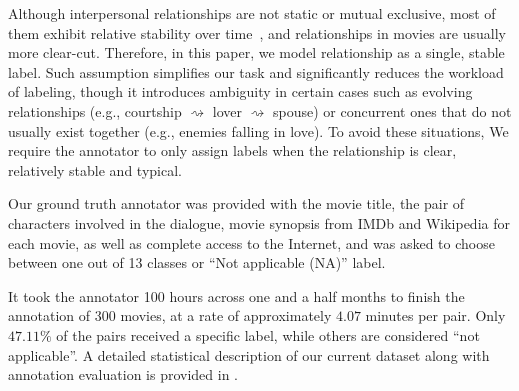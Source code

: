 Although interpersonal relationships are not static or mutual exclusive, 
most of them exhibit relative stability over time~\cite{stability}, and
 relationships in movies are usually more clear-cut. 
Therefore, in this paper, we model relationship as a single, 
stable label. Such assumption simplifies our task and 
significantly reduces the workload of labeling, though it introduces 
ambiguity in certain cases such as evolving relationships 
(e.g., courtship $\rightsquigarrow$ lover $\rightsquigarrow$ spouse) or 
concurrent ones that do not usually exist together
(e.g., enemies falling in love). To avoid these situations, 
We require the annotator to only 
assign labels when the relationship is clear, relatively stable and typical.

Our ground truth annotator was provided with the movie title, 
the pair of characters involved in the dialogue, 
movie synopsis from IMDb and Wikipedia for each movie, 
as well as complete access to the Internet, 
and was asked to choose between one out of 13 classes or 
``Not applicable (NA)'' label. 

It took the annotator 100 hours across one and a half months to 
finish the annotation of 300 movies, at a rate of approximately 
$4.07$ minutes per pair. Only $47.11\%$ of the pairs
received a specific label, while others are considered ``not applicable''. 
A detailed statistical description of our current dataset 
along with annotation evaluation is provided in .

